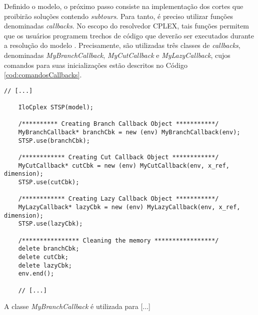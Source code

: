Definido o modelo, o próximo passo consiste na implementação dos cortes que proibirão soluções contendo \textit{subtours}. Para tanto, é preciso utilizar funções denominadas \textit{callbacks}. No escopo do resolvedor CPLEX, tais funções permitem que os usuários programem trechos de código que deverão ser executados durante a resolução do modelo \cite{CallbackCPLEX}. Precisamente, são utilizadas três classes de \textit{callbacks}, denominadas \emph{MyBranchCallback}, \emph{MyCutCallback} e \emph{MyLazyCallback}, cujos comandos para suas inicializações estão descritos no Código \ref{cod:comandosCallbacks}. 

\begin{lstlisting}[style=cplusplusListStyle, caption= Comandos do CPLEX para a utilização das \textit{callbacks}, label=cod:comandosCallbacks]
    // [...]
    
    IloCplex STSP(model);
    
    /********** Creating Branch Callback Object ***********/
    MyBranchCallback* branchCbk = new (env) MyBranchCallback(env);
    STSP.use(branchCbk);

    /************ Creating Cut Callback Object ************/
    MyCutCallback* cutCbk = new (env) MyCutCallback(env, x_ref, dimension);
    STSP.use(cutCbk);

    /************ Creating Lazy Callback Object ***********/
    MyLazyCallback* lazyCbk = new (env) MyLazyCallback(env, x_ref, dimension);
    STSP.use(lazyCbk);
    
    /**************** Cleaning the memory *****************/
    delete branchCbk;
    delete cutCbk;
    delete lazyCbk;
    env.end();

    // [...]
\end{lstlisting}

A classe \emph{MyBranchCallback} é utilizada para {\color{red}[...]}

